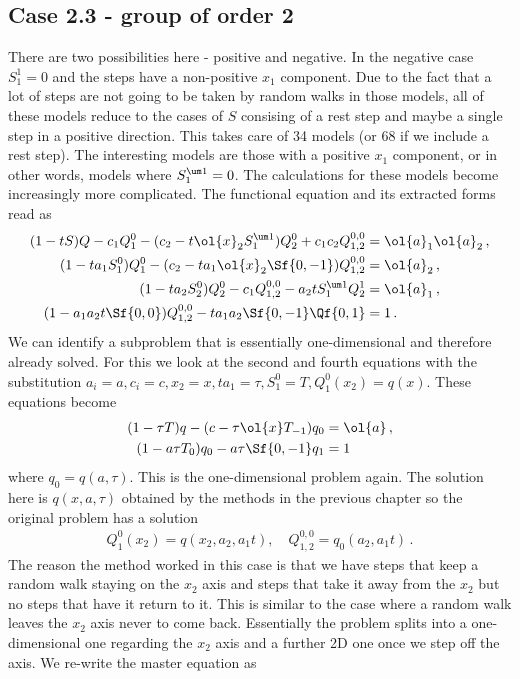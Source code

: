 \subsection{Case 2.3 - group of order 2}
There are two possibilities here - positive and negative. In the negative case $S_1^1 = 0$ and the steps have a non-positive $x_1$ component. Due to the fact that a lot of steps are not going to be taken by random walks in those models, all of these models reduce to the cases of $S$ consising of a rest step and maybe a single step in a positive direction. This takes care of 34 models (or 68 if we include a rest step). The interesting models are those with a positive $x_1$ component, or in other words, models where $S_1^{\um 1} = 0$. The calculations for these models become increasingly more complicated. The functional equation and its extracted forms read as
\begin{align}\begin{split}
(1-tS)Q - c_1 Q_1^0- (c_2 -t\ol{x}_2 S_1^{\um 1})Q_2^0+ c_1c_2 Q_{1,2}^{0,0}  &= \ol{a}_1\ol{a}_2\,,\\
(1-ta_1 S_1^0)Q_1^0 - (c_2 - ta_1 \ol{x}_2 \Sf{0,-1})Q_{1,2}^{0,0} &=\ol{a}_2\,,\\
(1-ta_2 S_2^0)Q_2^0 - c_1Q_{1,2}^{0,0}  - a_2 t S_1^{\um 1} Q_2^1&=\ol{a}_1\,,\\
(1-a_1 a_2 t \Sf{0,0})Q_{1,2}^{0,0} - ta_1 a_2 \Sf{0,-1} \Qf{0,1} &= 1\,.
\end{split}\end{align}
We can identify a subproblem that is essentially one-dimensional and therefore already solved. For this we look at the second and fourth equations with the substitution $a_i = a, c_i = c, x_2 = x, ta_1 = \tau, S_1^0 = T, Q_1^0 (x_2)= q(x)$. These equations become
\begin{align}
(1-\tau T)q - (c - \tau  \ol{x} T_{-1})q_0 &=\ol{a}\,,\\
(1-a \tau T_0)q_0 - a\tau \Sf{0,-1} q_1 &= 1
\end{align}
where $q_0 = q(a,\tau)$. This is the one-dimensional problem again. The solution here is $q(x,a,\tau)$ obtained by the methods in the previous chapter so the original problem has a solution
\begin{align}
	Q_1^0(x_2) = q(x_2,a_2,a_1t),\quad Q_{1,2}^{0,0} = q_0(a_2,a_1t)\,.
\end{align}
The reason the method worked in this case is that we have steps that keep a random walk staying on the $x_2$ axis and steps that take it away from the $x_2$ but no steps that have it return to it. This is similar to the case where a random walk leaves the $x_2$ axis never to come back. Essentially the problem splits into a one-dimensional one regarding the $x_2$ axis and a further 2D one once we step off the axis. We re-write the master equation as
